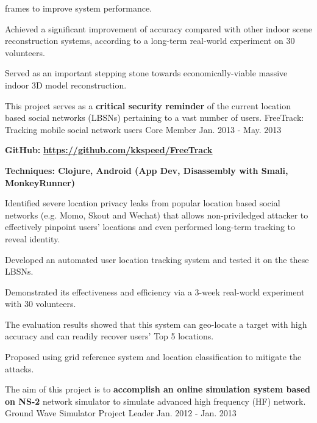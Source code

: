 \begin{cventries}
{\begin{cvitems}
frames to improve system performance.
\item Achieved a significant improvement of accuracy compared with other indoor scene reconstruction systems, according to a long-term real-world experiment on 30 volunteers. 
\item Served as an important stepping stone towards economically-viable massive indoor 3D model reconstruction. 
      \end{cvitems}
    }
  \cventry
    {This project serves as a \textbf{critical security reminder} of the current location based social networks (LBSNs) pertaining to a vast number of users. }
    {FreeTrack: Tracking mobile social network users}
    {Core Member}
    {Jan. 2013 - May. 2013}
    {
      \begin{cvitems}
                  \item \textbf{GitHub:} \href{https://github.com/kkspeed/FreeTrack}{\textbf{\underline{https://github.com/kkspeed/FreeTrack}}}
      \item \textbf{Techniques: Clojure, Android (App Dev, Disassembly with Smali, MonkeyRunner)} 
\item Identified severe location privacy leaks from popular location based social networks (e.g. Momo,
Skout and Wechat) that allows non-priviledged attacker to effectively pinpoint users' locations and even
performed long-term tracking to reveal identity. 
\item Developed an automated user location tracking system
and tested it on the these LBSNs. 
\item Demonstrated its effectiveness and efficiency via a 3-week real-world
experiment with 30 volunteers.
\item The evaluation results showed that this system can geo-locate a target with high
accuracy and can readily recover users' Top 5 locations. 
\item Proposed using grid reference system
and location classification to mitigate the attacks.
      \end{cvitems} 
    }
  \cventry
    {The aim of this project is to \textbf{accomplish an online simulation system based on NS-2} network simulator to simulate advanced high frequency (HF) network.}
    {Ground Wave Simulator}
    {Project Leader}
    {Jan. 2012 - Jan. 2013}

\end{cventries}
